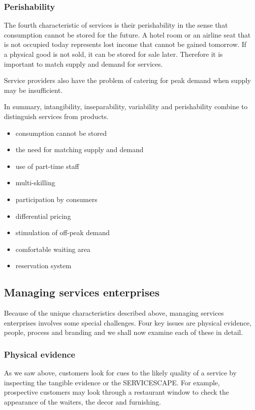 \documentclass{article}
\begin{document}
\subsubsection*{Perishability}
The fourth characteristic of services is their perishability in the sense that consumption cannot be stored for the future. A hotel room or an airline seat that is not occupied today represents lost income that cannot be gained tomorrow. If a physical good is not sold, it can be stored for sale later. Therefore it is important to match supply and demand for services. 

Service providers also have the problem of catering for peak demand when supply may be insufficient. 

In summary, intangibility, inseparability, variability and perishability combine to distinguish services from products. 

\begin{itemize}
    \item consumption cannot be stored
    \item the need for matching supply and demand
    \item use of part-time staff
    \item multi-skilling
    \item participation by consumers
    \item differential pricing
    \item stimulation of off-peak demand
    \item comfortable waiting area
    \item reservation system
\end{itemize}

\subsection{Managing services enterprises}
Because of the unique characteristics described above, managing services enterprises involves some special challenges. Four key issues are physical evidence, people, process and branding and we shall now examine each of these in detail.

\subsubsection*{Physical evidence}
As we saw above, customers look for cues to the likely quality of a service by inspecting the tangible evidence or the SERVICESCAPE. For example, prospective customers may look through a restaurant window to check the appearance of the waiters, the decor and furnishing. 
\end{document}
